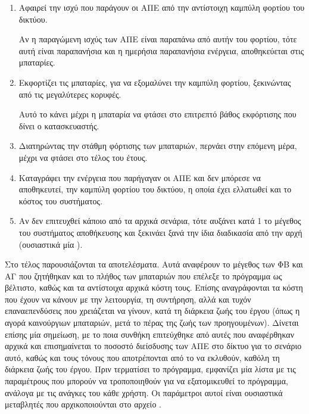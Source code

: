 \documentclass[12pt]{report}
\begin{document}
\begin{enumerate}
\item Αφαιρεί την ισχύ που παράγουν οι ΑΠΕ από την αντίστοιχη καμπύλη φορτίου του δικτύου. 

			Αν η παραγώμενη ισχύς των ΑΠΕ είναι παραπάνω από αυτήν του φορτίου, τότε αυτή είναι παραπανήσια και η ημερήσια παραπανήσια ενέργεια, αποθηκεύεται στις μπαταρίες.
\item Εκφορτίζει τις μπαταρίες, για να εξομαλύνει την καμπύλη φορτίου, ξεκινώντας από τις μεγαλύτερες κορυφές. 

			Αυτό το κάνει μέχρι η μπαταρία να φτάσει στο επιτρεπτό βάθος εκφόρτισης που δίνει ο κατασκευαστής.
\item Διατηρώντας την στάθμη φόρτισης των μπαταριών, περνάει στην επόμενη μέρα, μέχρι να φτάσει στο τέλος του έτους.
\item Καταγράφει την ενέργεια που παρήγαγαν οι ΑΠΕ και δεν μπόρεσε να αποθηκευτεί, την καμπύλη φορτίου του δικτύου, η οποία έχει ελλατωθεί και το κόστος του συστήματος.
\item Αν δεν επιτευχθεί κάποιο από τα αρχικά σενάρια, τότε αυξάνει κατά 1 το μέγεθος του συστήματος αποθήκευσης και ξεκινάει ξανά την ίδια διαδικασία από την αρχή (ουσιαστικά μία {}).
\end{enumerate}

Στο τέλος παρουσιάζονται τα αποτελέσματα. Αυτά αναφέρουν το μέγεθος των ΦΒ και ΑΓ που ζητήθηκαν και το πλήθος των μπαταριών που επέλεξε το πρόγραμμα ως βέλτιστο, καθώς και τα αντίστοιχα αρχικά κόστη τους. Επίσης αναγράφονται τα κόστη
που έχουν να κάνουν με την λειτουργία, τη συντήρηση, αλλά και τυχόν επαναεπενδύσεις που χρειάζεται να γίνουν, κατά τη διάρκεια ζωής του έργου (όπως η αγορά καινούργιων μπαταριών, μετά το πέρας της ζωής των προηγουμένων). Δίνεται 
επίσης μία σημείωση, με το ποια συνθήκη επιτεύχθηκε από αυτές που αναφέρθηκαν αρχικά και επισημαίνεται το ποσοστό διείσδυσης των ΑΠΕ στο δίκτυο για το σενάριο αυτό, καθώς και τους τόνους {} που αποτρέπονται από το
να εκλυθούν, καθόλη τη διάρκεια ζωής του έργου. Πριν τερματίσει το πρόγραμμα, εμφανίζει μία λίστα με τις παραμέτρους που μπορούν να τροποποιηθούν για να εξατομικευθεί το πρόγραμμα, ανάλογα με τις ανάγκες του κάθε χρήστη. 
Οι παράμετροι αυτοί είναι ουσιαστικά μεταβλητές που αρχικοποιούνται στο αρχείο {}.
\end{document}
